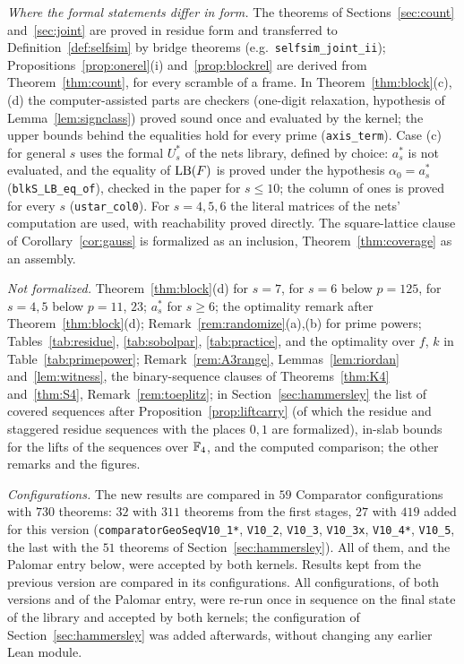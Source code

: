 \emph{Where the formal statements differ in form.} The theorems of Sections~\ref{sec:count} and~\ref{sec:joint} are proved in residue form and transferred to Definition~\ref{def:selfsim} by bridge theorems (e.g.\ \texttt{selfsim\_joint\_ii}); Propositions~\ref{prop:onerel}(i) and~\ref{prop:blockrel} are derived from Theorem~\ref{thm:count}, for every scramble of a frame. In Theorem~\ref{thm:block}(c),(d) the computer-assisted parts are checkers (one-digit relaxation, hypothesis of Lemma~\ref{lem:signclass}) proved sound once and evaluated by the kernel; the upper bounds behind the equalities hold for every prime (\texttt{axis\_term}). Case (c) for general $s$ uses the formal $U^*_s$ of the nets library, defined by choice: $a^*_s$ is not evaluated, and the equality of $\mathrm{LB}(F)$ is proved under the hypothesis $\alpha_0=a^*_s$ (\texttt{blkS\_LB\_eq\_of}), checked in the paper for $s\le10$; the column of ones is proved for every $s$ (\texttt{ustar\_col0}). For $s=4,5,6$ the literal matrices of the nets' computation are used, with reachability proved directly. The square-lattice clause of Corollary~\ref{cor:gauss} is formalized as an inclusion, Theorem~\ref{thm:coverage} as an assembly.

\emph{Not formalized.} Theorem~\ref{thm:block}(d) for $s=7$, for $s=6$ below $p=125$, for $s=4,5$ below $p=11$, $23$; $a^*_s$ for $s\ge6$; the optimality remark after Theorem~\ref{thm:block}(d); Remark~\ref{rem:randomize}(a),(b) for prime powers; Tables~\ref{tab:residue}, \ref{tab:sobolpar}, \ref{tab:practice}, and the optimality over $f$, $k$ in Table~\ref{tab:primepower}; Remark~\ref{rem:A3range}, Lemmas~\ref{lem:riordan} and~\ref{lem:witness}, the binary-sequence clauses of Theorems~\ref{thm:K4} and~\ref{thm:S4}, Remark~\ref{rem:toeplitz}; in Section~\ref{sec:hammersley} the list of covered sequences after Proposition~\ref{prop:liftcarry} (of which the residue and staggered residue sequences with the places $0,1$ are formalized), in-slab bounds for the lifts of the sequences over $\mathbb{F}_4$, and the computed comparison; the other remarks and the figures.

\emph{Configurations.} The new results are compared in $59$ Comparator configurations with $730$ theorems: $32$ with $311$ theorems from the first stages, $27$ with $419$ added for this version (\texttt{comparatorGeoSeqV10\_1*}, \texttt{V10\_2}, \texttt{V10\_3}, \texttt{V10\_3x}, \texttt{V10\_4*}, \texttt{V10\_5}, the last with the $51$ theorems of Section~\ref{sec:hammersley}). All of them, and the Palomar entry below, were accepted by both kernels. Results kept from the previous version are compared in its configurations. All configurations, of both versions and of the Palomar entry, were re-run once in sequence on the final state of the library and accepted by both kernels; the configuration of Section~\ref{sec:hammersley} was added afterwards, without changing any earlier Lean module.

